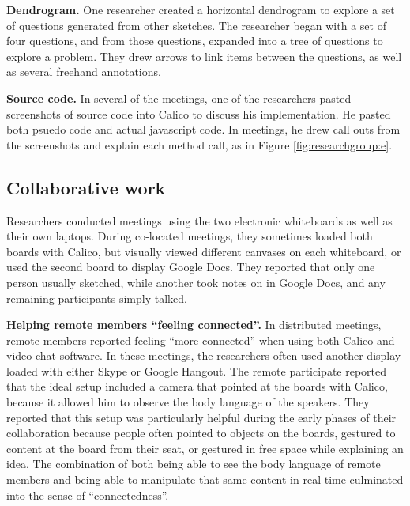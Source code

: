 \textbf{Dendrogram.} One researcher created a horizontal dendrogram to explore a set of questions generated from other sketches. The researcher began with a set of four questions, and from those questions, expanded into a tree of questions to explore a problem. They drew arrows to link items between the questions, as well as several freehand annotations.

\textbf{Source code.} In several of the meetings, one of the researchers pasted screenshots of source code into Calico to discuss his implementation. He pasted both psuedo code and actual javascript code. In meetings, he drew call outs from the screenshots and explain each method call, as in Figure \ref{fig:researchgroup:e}. 

\subsection{Collaborative work}

Researchers conducted meetings using the two electronic whiteboards as well as their own laptops. During co-located meetings, they sometimes loaded both boards with Calico, but visually viewed different canvases on each whiteboard, or used the second board to display Google Docs. They reported that only one person usually sketched, while another took notes on in Google Docs, and any remaining participants simply talked. 


\textbf{Helping remote members ``feeling connected''.} In distributed meetings, remote members reported feeling ``more connected'' when using both Calico and video chat software. In these meetings, the researchers often used another display loaded with either Skype or Google Hangout. The remote participate reported that the ideal setup included a camera that pointed at the boards with Calico, because it allowed him to observe the body language of the speakers. They reported that this setup was particularly helpful during the early phases of their collaboration because people often pointed to objects on the boards, gestured to content at the board from their seat, or gestured in free space while explaining an idea. The combination of both being able to see the body language of remote members and being able to manipulate that same content in real-time culminated into the sense of ``connectedness''.

